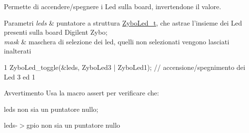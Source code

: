 Permette di accendere/spegnere i Led sulla board, invertendone il valore. 


\begin{DoxyParams}{Parametri}
{\em leds} & puntatore a struttura \hyperlink{struct_zybo_led__t}{Zybo\+Led\+\_\+t}, che astrae l'insieme dei Led presenti sulla board Digilent Zybo; \\
\hline
{\em mask} & maschera di selezione dei led, quelli non selezionati vengono lasciati inalterati\\
\hline
\end{DoxyParams}

\begin{DoxyCode}
1 ZyboLed\_toggle(&leds, ZyboLed3 | ZyboLed1); // accensione/spegnimento dei Led 3 ed 1
\end{DoxyCode}


\begin{DoxyWarning}{Avvertimento}
Usa la macro assert per verificare che\+:
\begin{DoxyItemize}
\item leds non sia un puntatore nullo;
\item leds-\/$>$gpio non sia un puntatore nullo 
\end{DoxyItemize}
\end{DoxyWarning}
